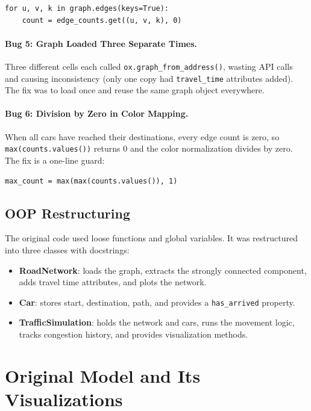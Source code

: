 \documentclass[12pt]{article}
\begin{document}
\begin{lstlisting}
for u, v, k in graph.edges(keys=True):
    count = edge_counts.get((u, v, k), 0)
\end{lstlisting}

\paragraph{Bug 5: Graph Loaded Three Separate Times.}
Three different cells each called \texttt{ox.graph\_from\_address()}, wasting API calls and causing inconsistency (only one copy had \texttt{travel\_time} attributes added). The fix was to load once and reuse the same graph object everywhere.

\paragraph{Bug 6: Division by Zero in Color Mapping.}
When all cars have reached their destinations, every edge count is zero, so \texttt{max(counts.values())} returns 0 and the color normalization divides by zero. The fix is a one-line guard:

\begin{lstlisting}
max_count = max(max(counts.values()), 1)
\end{lstlisting}

\subsection{OOP Restructuring}

The original code used loose functions and global variables. It was restructured into three classes with docstrings:
\begin{itemize}
    \item \textbf{RoadNetwork}: loads the graph, extracts the strongly connected component, adds travel time attributes, and plots the network.
    \item \textbf{Car}: stores start, destination, path, and provides a \texttt{has\_arrived} property.
    \item \textbf{TrafficSimulation}: holds the network and cars, runs the movement logic, tracks congestion history, and provides visualization methods.
\end{itemize}


\section{Original Model and Its Visualizations}
\end{document}
